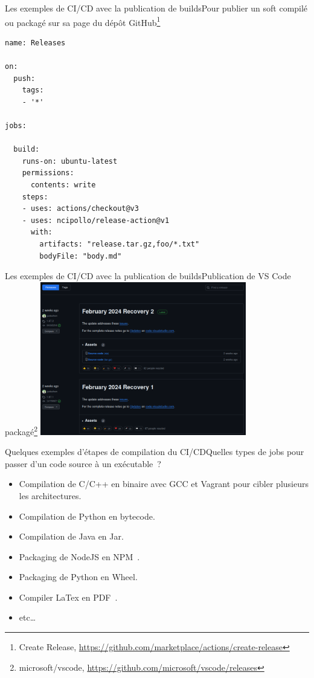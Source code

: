 \documentclass{beamer}
\begin{document}
    \begin{frame}[fragile]{Les exemples de CI/CD avec la publication de builds}{Pour publier un soft compilé ou packagé sur sa page du dépôt GitHub\footnote{Create Release, \url{https://github.com/marketplace/actions/create-release}}}
        \transdissolve
        \begin{lstlisting}
name: Releases

on:
  push:
    tags:
    - '*'

jobs:

  build:
    runs-on: ubuntu-latest
    permissions:
      contents: write
    steps:
    - uses: actions/checkout@v3
    - uses: ncipollo/release-action@v1
      with:
        artifacts: "release.tar.gz,foo/*.txt"
        bodyFile: "body.md"
        \end{lstlisting}
    \end{frame}

    \begin{frame}{Les exemples de CI/CD avec la publication de builds}{Publication de VS Code packagé\footnote{microsoft/vscode, \url{https://github.com/microsoft/vscode/releases}}}
        \transdissolve
        \centering
        \includegraphics[width=9cm]{image/vs-code-release}
    \end{frame}

    \begin{frame}{Quelques exemples d'étapes de compilation du CI/CD}{Quelles types de jobs pour passer d'un code source à un exécutable~?}
        \transdissolve
        \pause
        \begin{itemize}
            \item Compilation de C/C++ en binaire avec GCC et Vagrant pour cibler plusieurs les architectures.
            \item Compilation de Python en bytecode.
            \item Compilation de Java en Jar.
            \item Packaging de NodeJS en NPM~.
            \item Packaging de Python en Wheel.
            \item Compiler LaTex en PDF~.
            \item etc\ldots
        \end{itemize}
    \end{frame}
\end{document}
